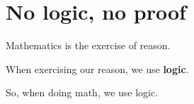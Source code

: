 





\chapter{No logic, no proof}

Mathematics is the exercise of reason. \par
When exercising our reason, we use {\bf logic}. \par
So, when doing math, we use logic. \par

